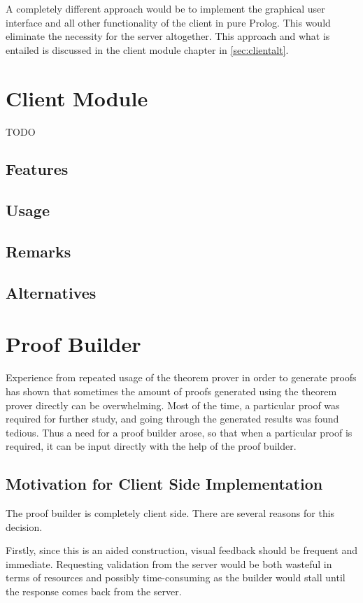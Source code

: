 \documentclass[11pt,twoside,a4paper]{report}
\begin{document}
A completely different approach would be to implement the graphical user interface and all other functionality of the client in pure Prolog. This would eliminate the necessity for the server altogether. This approach and what is entailed is discussed in the client module chapter in \autoref{sec:clientalt}.

\chapter{Client Module}
\label{chap:client}
TODO
\section{Features}
\section{Usage}
\section{Remarks}
\section{Alternatives}
\label{sec:clientalt}




\chapter{Proof Builder}
\label{chap:proofbuilder}
Experience from repeated usage of the theorem prover in order to generate proofs has shown that sometimes the amount of proofs generated using the theorem prover directly can be overwhelming. Most of the time, a particular proof was required for further study, and going through the generated results was found tedious. Thus a need for a proof builder arose, so that when a particular proof is required, it can be input directly with the help of the proof builder.

\section{Motivation for Client Side Implementation}
The proof builder is completely client side. There are several reasons for this decision. 

Firstly, since this is an aided construction, visual feedback should be frequent and immediate. Requesting validation from the server would be both wasteful in terms of resources and possibly time-consuming as the builder would stall until the response comes back from the server. 
\end{document}
